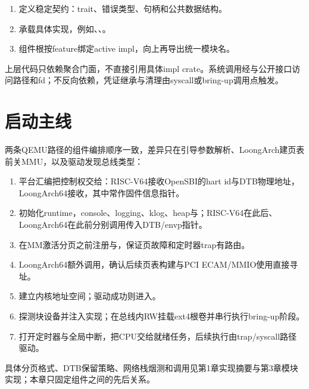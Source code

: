 \begin{enumerate}
 \item {}定义稳定契约：trait、错误类型、句柄和公共数据结构。
 \item {}承载具体实现，例如、、。
 \item 组件根按feature绑定active impl，向上再导出统一模块名。
\end{enumerate}

上层代码只依赖聚合门面，不直接引用具体impl crate。系统调用经与公开接口访问路径和fd；不反向依赖，凭证继承与清理由syscall或bring-up调用点触发。


\section{启动主线}

两条QEMU路径的组件编排顺序一致，差异只在引导参数解析、LoongArch建页表前关MMU，以及驱动发现总线类型：

\begin{enumerate}
 \item 平台汇编把控制权交给：RISC-V64接收OpenSBI的hart id与DTB物理地址，LoongArch64接收，其中常作固件信息指针。
 \item 初始化runtime，console、logging、klog、heap与；RISC-V64在此后、LoongArch64在此前分别调用传入DTB/envp指针。
 \item 在MM激活分页之前注册与，保证页故障和定时器trap有路由。
 \item LoongArch64额外调用，确认后续页表构建与PCI ECAM/MMIO使用直接寻址。
 \item {}建立内核地址空间；驱动成功则进入。
 \item {}探测块设备并注入实现；在总线内RW挂载ext4根卷并串行执行bring-up阶段。
 \item 打开定时器与全局中断，把CPU交给就绪任务，后续执行由trap/syscall路径驱动。
\end{enumerate}

具体分页格式、DTB保留策略、网络栈烟测和调用见第1章实现摘要与第3章模块实现；本章只固定组件之间的先后关系。



